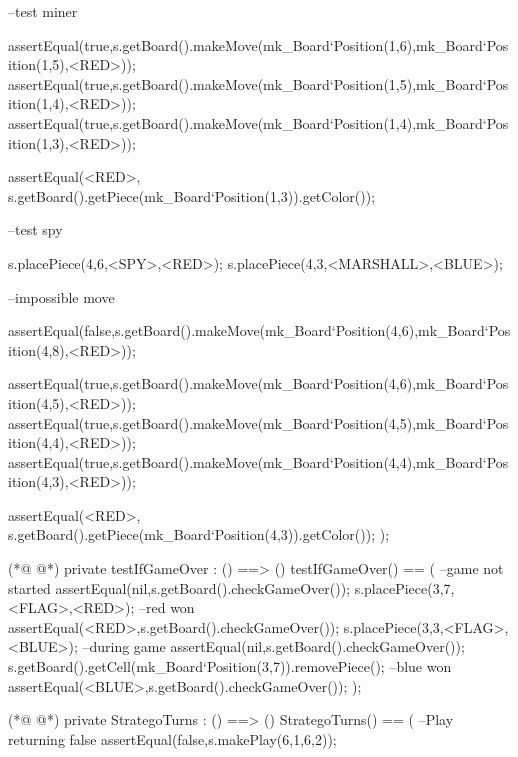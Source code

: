 \begin{vdmpp}[breaklines=true]
                  --test miner
                  
                  
                  assertEqual(true,s.getBoard().makeMove(mk_Board`Position(1,6),mk_Board`Position(1,5),<RED>));
                  assertEqual(true,s.getBoard().makeMove(mk_Board`Position(1,5),mk_Board`Position(1,4),<RED>));
                  assertEqual(true,s.getBoard().makeMove(mk_Board`Position(1,4),mk_Board`Position(1,3),<RED>));
                  
                  assertEqual(<RED>, s.getBoard().getPiece(mk_Board`Position(1,3)).getColor());
                  
                  --test spy
                  
                  s.placePiece(4,6,<SPY>,<RED>);
                  s.placePiece(4,3,<MARSHALL>,<BLUE>);
                  
                  --impossible move 
                  
                  assertEqual(false,s.getBoard().makeMove(mk_Board`Position(4,6),mk_Board`Position(4,8),<RED>));
                  
                  assertEqual(true,s.getBoard().makeMove(mk_Board`Position(4,6),mk_Board`Position(4,5),<RED>));
                  assertEqual(true,s.getBoard().makeMove(mk_Board`Position(4,5),mk_Board`Position(4,4),<RED>));
                  assertEqual(true,s.getBoard().makeMove(mk_Board`Position(4,4),mk_Board`Position(4,3),<RED>));
                  
                  assertEqual(<RED>, s.getBoard().getPiece(mk_Board`Position(4,3)).getColor());
                );
                
(*@
\label{testIfGameOver:158}
@*)
                private testIfGameOver : () ==> ()
                testIfGameOver() == (
                  --game not started
                  assertEqual(nil,s.getBoard().checkGameOver());
                  s.placePiece(3,7,<FLAG>,<RED>);
                  --red won
                  assertEqual(<RED>,s.getBoard().checkGameOver());
                  s.placePiece(3,3,<FLAG>,<BLUE>);
                  --during game
                  assertEqual(nil,s.getBoard().checkGameOver());
                  s.getBoard().getCell(mk_Board`Position(3,7)).removePiece();
                  --blue won
                  assertEqual(<BLUE>,s.getBoard().checkGameOver());
                );
                
(*@
\label{StrategoTurns:173}
@*)
                private StrategoTurns : () ==> ()
                StrategoTurns() == (
                 --Play returning false
                 assertEqual(false,s.makePlay(6,1,6,2));
                 

\end{vdmpp}
